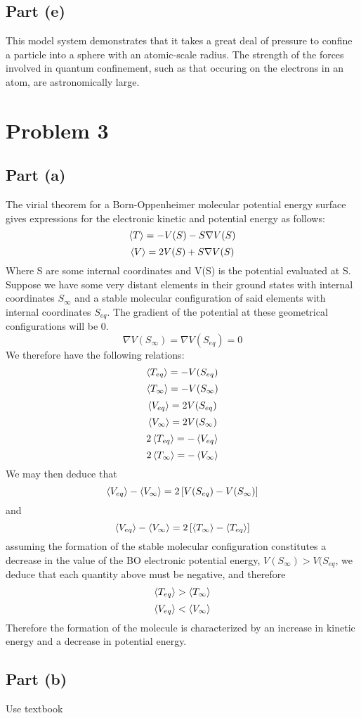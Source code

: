 \documentclass{article}
\begin{document}
\subsection{Part (e)}
This model system demonstrates that it takes a great deal of pressure to confine a particle into a sphere with an atomic-scale radius.  The strength of the forces involved in quantum confinement, such 
as that occuring on the electrons in an atom, are astronomically large.


\section{Problem 3}
\subsection{Part (a)}
The virial theorem for a Born-Oppenheimer molecular potential energy surface gives
expressions for the electronic kinetic and potential energy as follows:
\[\braket{T} = -V(S) - S \nabla V(S) \]
\[\braket{V} = 2V(S) + S \nabla V(S) \]
Where S are some internal coordinates and V(S) is the potential evaluated at S.
Suppose we have some very distant elements in their ground states with internal coordinates $S_\infty$
and a stable molecular configuration of said elements with internal coordinates $S_{eq}$.
The gradient of the potential at these geometrical configurations will be 0.
\[\nabla V(S_\infty) = \nabla V(S_{eq}) = 0 \]
We therefore have the following relations:
\[\braket{T_{eq}} = -V(S_{eq}) \] 
\[\braket{T_{\infty}} = -V(S_{\infty}) \] 
\[\braket{V_{eq}} = 2V(S_{eq}) \] 
\[\braket{V_{\infty}} = 2V(S_{\infty}) \] 
\[2\braket{T_{eq}} = -\braket{V_{eq}} \] 
\[2\braket{T_{\infty}} = - \braket{V_{\infty}} \] 
We may then deduce that 
\[ \braket{V_{eq}} - \braket{V_{\infty}} = 2 \left[ V(S_{eq}) - V(S_{\infty}) \right] \]
and
\[ \braket{V_{eq}} - \braket{V_{\infty}} = 2 \left[ \braket{T_\infty}  - \braket{T_{eq}} \right] \]
assuming the formation of the stable molecular configuration constitutes a decrease
in the value of the BO electronic potential energy, $V(S_\infty) > V(S_{eq}$, we deduce that each quantity above must be negative,
and therefore 
\[ \braket{T_{eq}} > \braket{T_{\infty}} \]
\[ \braket{V_{eq}} < \braket{V_{\infty}} \]
Therefore the formation of the molecule is characterized by an increase in kinetic energy and a decrease in potential energy.

\subsection{Part (b)}
Use textbook
\end{document}
